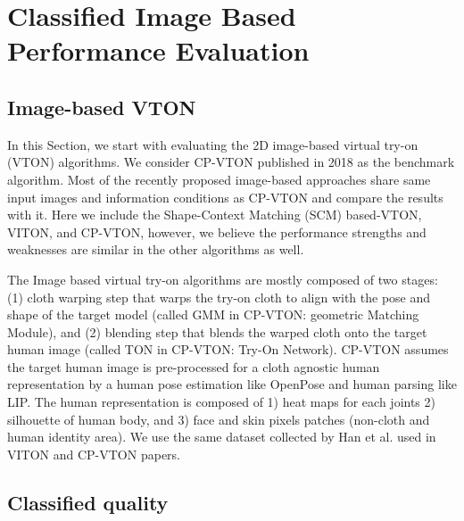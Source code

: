 \section{Classified Image Based Performance Evaluation}

\subsection{Image-based VTON}

In this Section, we start with evaluating the 2D image-based virtual try-on (VTON) algorithms. We consider CP-VTON\cite{Wang2018TowardCI} published in 2018 as the benchmark algorithm. Most of the recently proposed image-based approaches\cite{Han2017VITONAI,Sun2019ImageBasedVT,Yu_2019_ICCV} share same input images and information conditions as CP-VTON and compare the results with it. Here we include the Shape-Context Matching (SCM) based-VTON, VITON\cite{Han2017VITONAI}, and  CP-VTON\cite{Wang2018TowardCI}, however, we believe the performance strengths and weaknesses are similar in the other algorithms as well.


The Image based virtual try-on algorithms are mostly composed of two stages: (1) cloth warping step that warps the try-on cloth to align with the pose and shape of the target model (called GMM in CP-VTON: geometric Matching Module)\cite{Wang2018TowardCI}, and (2) blending step that blends the warped cloth onto the target human image (called TON in CP-VTON: Try-On Network)\cite{Wang2018TowardCI}. CP-VTON assumes the target human image is pre-processed for a cloth agnostic human representation by a human pose estimation like OpenPose\cite{Cao2018OpenPoseRM} and human parsing like LIP\cite{Liang2018LookIP}. The human representation is composed of 1) heat maps for each joints 2) silhouette of human body, and 3) face and skin pixels patches (non-cloth and human identity area). We use the same dataset collected by Han et al. used in VITON\cite{Han2017VITONAI} and CP-VTON\cite{Wang2018TowardCI} papers.
 

\subsection{Classified quality}

